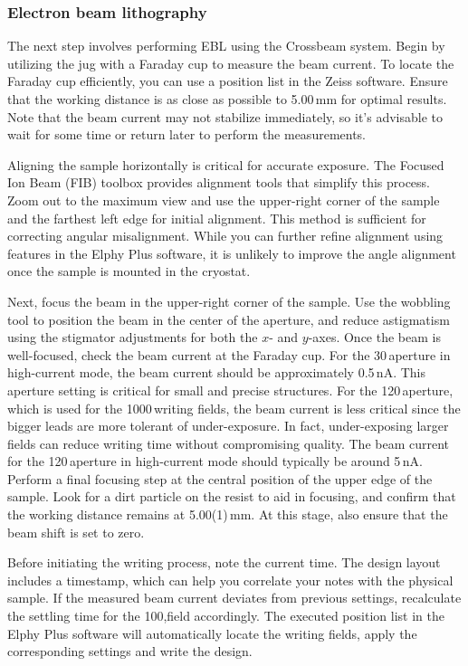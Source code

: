     \subsubsection*{Electron beam lithography}
        The next step involves performing EBL using the Crossbeam system. Begin by utilizing the jug with a Faraday cup to measure the beam current. To locate the Faraday cup efficiently, you can use a position list in the Zeiss software. Ensure that the working distance is as close as possible to 5.00\,mm for optimal results. Note that the beam current may not stabilize immediately, so it's advisable to wait for some time or return later to perform the measurements.

        Aligning the sample horizontally is critical for accurate exposure. The Focused Ion Beam (FIB) toolbox provides alignment tools that simplify this process. Zoom out to the maximum view and use the upper-right corner of the sample and the farthest left edge for initial alignment. This method is sufficient for correcting angular misalignment. While you can further refine alignment using features in the Elphy Plus software, it is unlikely to improve the angle alignment once the sample is mounted in the cryostat.

        Next, focus the beam in the upper-right corner of the sample. Use the wobbling tool to position the beam in the center of the aperture, and reduce astigmatism using the stigmator adjustments for both the $x$- and $y$-axes. Once the beam is well-focused, check the beam current at the Faraday cup. For the 30\,\mum aperture in high-current mode, the beam current should be approximately 0.5\,nA. This aperture setting is critical for small and precise structures. For the 120\,\mum  aperture, which is used for the 1000\,\mum writing fields, the beam current is less critical since the bigger leads are more tolerant of under-exposure. In fact, under-exposing larger fields can reduce writing time without compromising quality. The beam current for the 120\,\mum aperture in high-current mode should typically be around 5\,nA. Perform a final focusing step at the central position of the upper edge of the sample. Look for a dirt particle on the resist to aid in focusing, and confirm that the working distance remains at 5.00(1)\,mm. At this stage, also ensure that the beam shift is set to zero.

        Before initiating the writing process, note the current time. The design layout includes a timestamp, which can help you correlate your notes with the physical sample. If the measured beam current deviates from previous settings, recalculate the settling time for the 100,\mum field accordingly. The executed position list in the Elphy Plus software will automatically locate the writing fields, apply the corresponding settings and write the design. 
        
